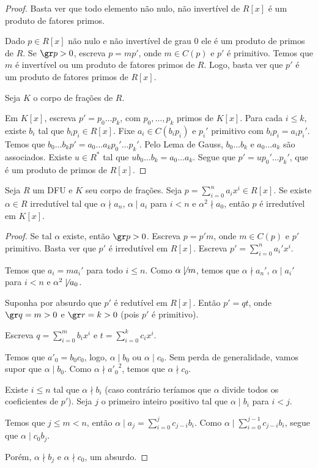     \begin{proof}
        Basta ver que todo elemento não nulo, não invertível de $R[x]$ é um produto de fatores primos.

        Dado $p \in R[x]$ não nulo e não invertível de grau $0$ ele é um produto de primos de $R$. Se $\gr p>0$, escreva $p=mp'$, onde $m \in C(p)$ e $p'$ é primitivo. Temos que $m$ é invertível ou um produto de fatores primos de $R$. Logo, basta ver que $p'$ é um produto de fatores primos de $R[x]$.

        Seja $K$ o corpo de frações de $R$.

        Em $K[x]$, escreva $p'=p_0\dots p_k$, com $p_0,\dots, p_k$ primos de $K[x]$. Para cada $i\leq k$, existe $b_i$ tal que $b_i p_i\in R[x]$.
        Fixe $a_i \in C(b_ip_i)$ e $p_i'$ primitivo com $b_ip_i=a_ip_i'$. Temos que $b_0 \dots b_k p'= a_0\dots a_k p_0'\dots p_k'$. Pelo Lema de Gauss, $b_0 \dots b_k$ e $a_0\dots a_k$ são associados. Existe $u \in R^*$  tal que $u b_0 \dots b_k= a_0\dots a_k$. Segue que $p'=up_0'\dots p_k'$, que é um produto de primos de $R[x]$.
    \end{proof}

     \begin{theorem}
        Seja $R$ um DFU e $K$ seu corpo de frações. Seja $p=\sum_{i=0}^n a_ix^i \in R[x]$. Se existe $\alpha \in R$ irredutível tal que $\alpha\nmid a_n$, $\alpha \mid a_i$ para $i<n$ e $\alpha^2\nmid a_0$, então $p$ é irredutível em $K[x]$.
    \end{theorem}

    \begin{proof}
        Se tal $\alpha$ existe, então $\gr p>0$.
        Escreva $p=p'm$, onde $m \in C(p)$ e $p'$ primitivo. Basta ver que $p'$ é irredutível em $R[x]$.
        Escreva $p'=\sum_{i=0}^n a_i' x^i$.
        
        Temos que $a_i=m a_i'$ para todo $i\leq n$. Como $\alpha \not \mid m$, temos que  $\alpha\nmid a_n'$, $\alpha\mid a_i'$ para $i<n$ e $\alpha^2 \not \mid a_0$.

        Suponha por absurdo que $p'$ é redutível em $R[x]$.
        Então $p'=qt$, onde $\gr q=m>0$ e $\gr r=k>0$  (pois $p'$ é primitivo).

        Escreva $q=\sum_{i=0}^m b_i x^i$ e $t=\sum_{i=0}^k c_i x^i$.

        Temos que $a'_0=b_0c_0$, logo, $\alpha \mid b_0$ ou $\alpha \mid c_0$. Sem perda de generalidade, vamos supor que $\alpha \mid b_0$. Como $\alpha\nmid {a'_0}^2$, temos que $\alpha \nmid c_0$.

        Existe $i\leq n$ tal que $\alpha \nmid b_i$ (caso contrário teríamos que $\alpha$ divide todos os coeficientes de $p'$). Seja $j$ o primeiro inteiro positivo tal que $\alpha\mid b_i$ para $i<j$.

        Temos que $j\leq m<n$, então $\alpha\mid a_j=\sum_{i=0}^j c_{j-i}b_i$. Como $\alpha\mid \sum_{i=0}^{j-1} c_{j-i}b_i$, segue que $\alpha\mid c_0 b_j$.
        
        Porém, $\alpha \nmid b_j$ e $\alpha \nmid c_0$, um absurdo.
    \end{proof}
